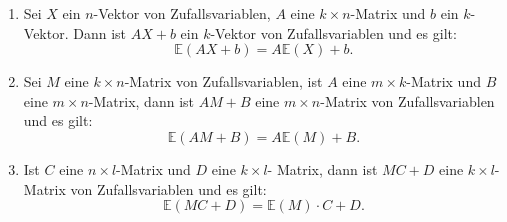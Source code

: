 \documentclass[10pt]{article}
\newcommand{\EW}{\mathbb{E}} %
\begin{document}
			\begin{Proposition}
				\begin{enumerate}
					\item Sei $X$ ein $n$-Vektor von Zufallsvariablen, $A$ eine $k \times n$-Matrix und $b$ ein $k$-Vektor. Dann ist $AX+b$ ein $k$-Vektor von Zufallsvariablen und es gilt:
					\begin{equation*}
						\EW(AX+b) = A \EW(X)+b.
					\end{equation*}
					\item Sei $M$ eine $k\times n$-Matrix von Zufallsvariablen, ist $A$ eine $m \times k$-Matrix und $B$ eine $m \times n$-Matrix, dann ist $AM+B$ eine $m \times n$-Matrix von Zufallsvariablen und es gilt:
					\begin{equation*}
						\EW(AM+B) = A\EW(M)+B.
					\end{equation*}
					\item  Ist $C$ eine $n \times l$-Matrix und $D$ eine $k\times l$- Matrix, dann ist $MC+D$ eine $k \times l$-Matrix von Zufallsvariablen und es gilt:
					\begin{equation*}
						\EW(MC+D) = \EW(M) \cdot C + D.
					\end{equation*}
				\end{enumerate}
			\end{Proposition}
			
\end{document}

